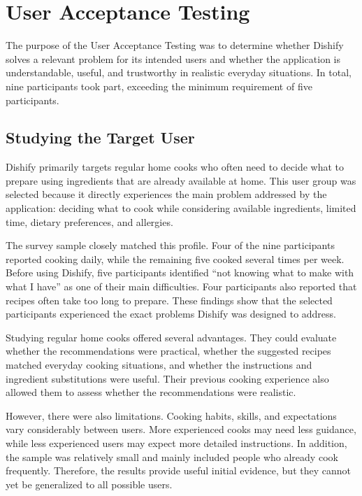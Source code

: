 
\chapter{User Acceptance Testing}
\label{ch:uat}

The purpose of the User Acceptance Testing was to determine whether Dishify
solves a relevant problem for its intended users and whether the application is
understandable, useful, and trustworthy in realistic everyday situations. In
total, nine participants took part, exceeding the minimum requirement of five
participants.

\section{Studying the Target User}

Dishify primarily targets regular home cooks who often need to decide what to
prepare using ingredients that are already available at home. This user group
was selected because it directly experiences the main problem addressed by the
application: deciding what to cook while considering available ingredients,
limited time, dietary preferences, and allergies.

The survey sample closely matched this profile. Four of the nine participants
reported cooking daily, while the remaining five cooked several times per week.
Before using Dishify, five participants identified ``not knowing what to make
with what I have'' as one of their main difficulties. Four participants also
reported that recipes often take too long to prepare. These findings show that
the selected participants experienced the exact problems Dishify was designed
to address.

Studying regular home cooks offered several advantages. They could evaluate
whether the recommendations were practical, whether the suggested recipes
matched everyday cooking situations, and whether the instructions and
ingredient substitutions were useful. Their previous cooking experience also
allowed them to assess whether the recommendations were realistic.

However, there were also limitations. Cooking habits, skills, and expectations
vary considerably between users. More experienced cooks may need less guidance,
while less experienced users may expect more detailed instructions. In
addition, the sample was relatively small and mainly included people who already
cook frequently. Therefore, the results provide useful initial evidence, but
they cannot yet be generalized to all possible users.


